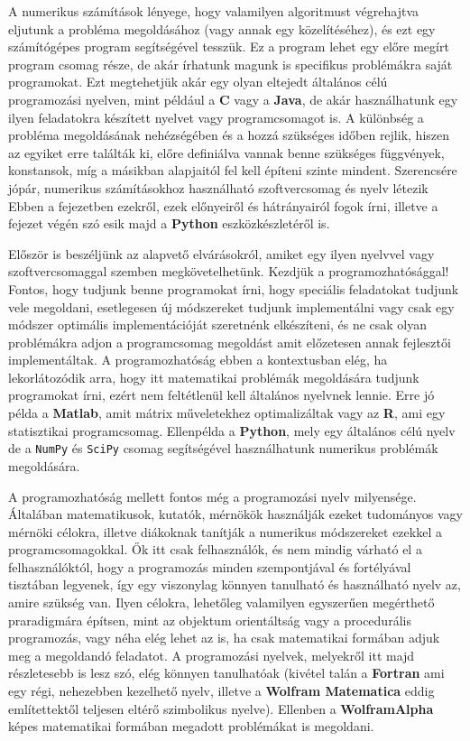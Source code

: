 
    A numerikus számítások lényege, hogy valamilyen algoritmust végrehajtva
eljutunk a probléma megoldásához (vagy annak egy közelítéséhez), és ezt egy számítógépes
program segítségével tesszük. Ez a program lehet egy előre megírt
program csomag része, de akár írhatunk magunk is specifikus problémákra
saját programokat. Ezt megtehetjük akár egy olyan eltejedt általános célú
programozási nyelven, mint például a \textbf{C} vagy a \textbf{Java}, de
akár használhatunk egy ilyen feladatokra készített nyelvet vagy
programcsomagot is. A különbség a probléma megoldásának nehézségében és a hozzá szükséges időben rejlik,
hiszen az egyiket erre találták ki, előre definiálva vannak benne
szükséges függvények, konstansok, míg a másikban alapjaitól fel kell
építeni szinte mindent. Szerencsére jópár, numerikus számításokhoz
használható szoftvercsomag és nyelv létezik
Ebben a fejezetben ezekről,
ezek előnyeiről és hátrányairól fogok írni, illetve a fejezet végén
szó esik majd a \textbf{Python} eszközkészletéről is.


Először is beszéljünk az alapvető elvárásokról, amiket egy ilyen
nyelvvel vagy szoftvercsomaggal szemben megkövetelhetünk. Kezdjük a
programozhatósággal! Fontos, hogy tudjunk benne programokat írni, hogy
speciális feladatokat tudjunk vele megoldani, esetlegesen új módszereket
tudjunk implementálni vagy csak egy módszer optimális implementációját
szeretnénk elkészíteni, és ne csak olyan problémákra adjon a
programcsomag megoldást amit előzetesen annak fejlesztői implementáltak.
A programozhatóság ebben a kontextusban elég, ha lekorlátozódik arra,
hogy itt matematikai problémák megoldására tudjunk programokat írni,
ezért nem feltétlenül kell általános nyelvnek lennie. Erre jó példa a
\textbf{Matlab}, amit mátrix műveletekhez optimalizáltak vagy az
\textbf{R}, ami egy statisztikai programcsomag. Ellenpélda a
\textbf{Python}, mely egy általános célú nyelv de a \texttt{NumPy} és
\texttt{SciPy} csomag segítségével használhatunk numerikus problémák
megoldására.

A programozhatóság mellett fontos még a programozási nyelv milyensége.
Általában matematikusok, kutatók, mérnökök használják ezeket tudományos
vagy mérnöki célokra, illetve diákoknak tanítják a numerikus módszereket
ezekkel a programcsomagokkal. Ők itt csak felhasználók, és nem mindig
várható el a felhasználóktól, hogy a programozás minden szempontjával és
fortélyával tisztában legyenek, így egy viszonylag könnyen tanulható és
használható nyelv az, amire szükség van.
Ilyen célokra, lehetőleg
valamilyen egyszerűen megérthető praradigmára építsen, mint az objektum
orientáltság vagy a procedurális programozás, vagy néha elég lehet az
is, ha csak matematikai formában adjuk meg a megoldandó feladatot. A
programozási nyelvek, melyekről itt majd részletesebb is lesz szó, elég
könnyen tanulhatóak (kivétel talán a \textbf{Fortran} ami egy régi,
nehezebben kezelhető nyelv, illetve a \textbf{Wolfram Matematica} eddig
említettektől teljesen eltérő szimbolikus nyelve). Ellenben a
\textbf{WolframAlpha} képes matematikai formában megadott problémákat is
megoldani.

